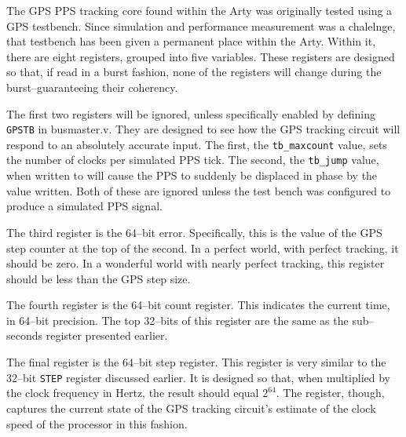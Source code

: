 \documentclass{gqtekspec}
\begin{document}
The GPS PPS tracking core found within the Arty was originally tested using
a GPS testbench.  Since simulation and performance measurement was a chalelnge,
that testbench has been given a permanent place within the Arty.  Within it,
there are eight registers, grouped into five variables.  These registers are
designed so that, if read in a burst fashion, none of the registers will
change during the burst--guaranteeing their coherency.

The first two registers will be ignored, unless specifically enabled by
defining {\tt GPSTB} in busmaster.v.  They are designed to see how the
GPS tracking circuit will respond to an absolutely accurate input.  The
first, the {\tt tb\_maxcount} value, sets the number of clocks per simulated
PPS tick.  The second, the {\tt tb\_jump} value, when written to will cause
the PPS to suddenly be displaced in phase by the value written.  Both of these
are ignored unless the test bench was configured to produce a simulated
PPS signal.

The third register is the 64--bit error.  Specifically, this is the value of
the GPS step counter at the top of the second.  In a perfect world, with
perfect tracking, it should be zero.  In a wonderful world with nearly perfect
tracking, this register should be less than the GPS step size.

The fourth register is the 64--bit count register.  This indicates the current
time, in 64--bit precision.  The top 32--bits of this register are the same
as the sub--seconds register presented earlier.

The final register is the 64--bit step register.  This register is very similar
to the 32--bit {\tt STEP} register discussed earlier.  It is designed so that,
when multiplied by the clock frequency in Hertz, the result should equal
$2^{64}$.  The register, though, captures the current state of the GPS tracking
circuit's estimate of the clock speed of the processor in this fashion.
\end{document}
